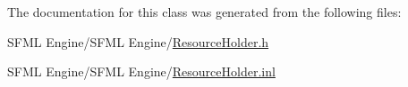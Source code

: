 The documentation for this class was generated from the following files\+:\begin{DoxyCompactItemize}
\item 
S\+F\+M\+L Engine/\+S\+F\+M\+L Engine/\hyperlink{_resource_holder_8h}{Resource\+Holder.\+h}\item 
S\+F\+M\+L Engine/\+S\+F\+M\+L Engine/\hyperlink{_resource_holder_8inl}{Resource\+Holder.\+inl}\end{DoxyCompactItemize}
